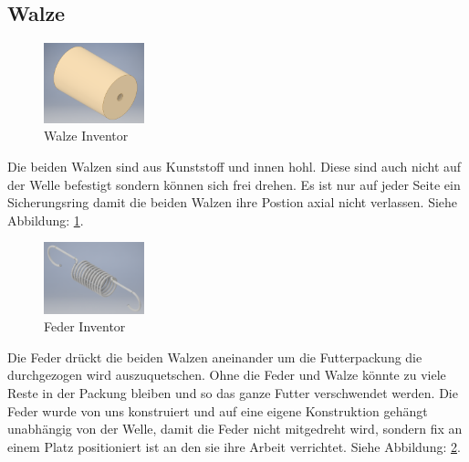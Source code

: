 \newpage
\subsection{Walze}

\begin{figure}
\vspace{-20pt}
  \begin{center}
    \includegraphics[width=0.26\textwidth]{Bilder/Inventor/Rolle}
  \end{center}
  \caption{Walze Inventor}
  \label{Walze_Inventor}
  \vspace{-20pt}
\end{figure}

Die beiden Walzen sind aus Kunststoff und innen hohl. Diese sind auch nicht auf der Welle befestigt sondern können sich frei drehen. Es ist nur auf jeder Seite ein Sicherungsring damit die beiden Walzen ihre Postion axial nicht verlassen. Siehe Abbildung: \ref{Walze_Inventor}. \\

\vspace{60pt}

\begin{figure}
\vspace{-20pt}
  \begin{center}
    \includegraphics[width=0.26\textwidth]{Bilder/Inventor/Feder}
  \end{center}
  \caption{Feder Inventor}
  \label{Feder_Inventor}
\end{figure}

Die Feder drückt die beiden Walzen aneinander um die Futterpackung die durchgezogen wird auszuquetschen. Ohne die Feder und Walze könnte zu viele Reste in der Packung bleiben und so das ganze Futter verschwendet werden. Die Feder wurde von uns konstruiert und auf eine eigene Konstruktion gehängt unabhängig von der Welle, damit die Feder nicht mitgedreht wird, sondern fix an einem Platz positioniert ist an den sie ihre Arbeit verrichtet. Siehe Abbildung: \ref{Feder_Inventor}.
